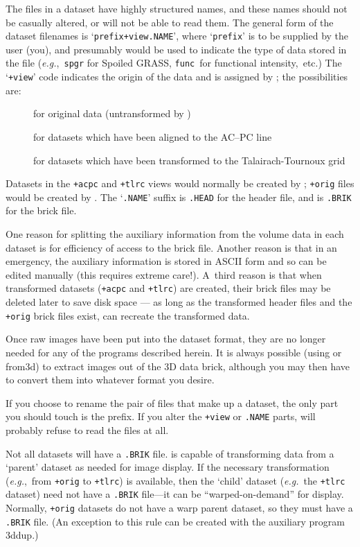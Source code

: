 The
files in a dataset have highly structured names, and these names should
not be casually altered, or \afnit will not be able to read them.
The general form of the dataset filenames is
`{\tt prefix+view.NAME}',
where `{\tt prefix}' is to be supplied by the user (you), and presumably
would be used to indicate the type of data stored in the file
({\it e.g.},~{\tt spgr} for Spoiled GRASS, {\tt func}~for functional intensity,~etc.)
The `{\tt +view}' code
indicates the origin of the data and is assigned by \afni;
the possibilities are:
\begin{description}
   \item[] for original data (untransformed by \afnit)
   \item[] for datasets which have been aligned to the AC--PC line
   \item[] for datasets which have been transformed to the Talairach-Tournoux grid
\end{description}
Datasets in the {\tt +acpc} and {\tt +tlrc} views would normally be
created by \afni; {\tt +orig} files would be created by \tothreed.
The `{\tt .NAME}' suffix is
{\tt .HEAD} for the header file, and is {\tt .BRIK} for the brick file.

One reason for splitting the auxiliary information from the volume data
in each dataset is for efficiency of access to the brick file.  Another
reason is that in an emergency, the auxiliary information is stored in
ASCII form and so can be edited manually (this requires extreme care!).
A~third reason is that when transformed datasets ({\tt +acpc} and {\tt +tlrc})
are created, their
brick files may be deleted later to save disk space --- as long as the
transformed header files and the {\tt +orig} brick files exist, \afnit
can recreate the transformed data.

Once raw images have been put into the \afnit dataset format, they are
no longer needed for any of the programs described herein.
It is always possible (using \afnit or {\sf from3d}) to extract images out of the 3D
data brick, although you may then have to convert them into whatever
format you desire.

If you choose to rename the pair of files that make up a dataset, the
only part you should touch is the prefix.  If you alter the {\tt +view}
or {\tt .NAME} parts, \afnit will probably refuse to read the files at all.

Not
all datasets will have a {\tt .BRIK} file.  \afnit is capable of
transforming data from a `parent' dataset as needed for image display.
If the necessary transformation ({\it e.g.},~from {\tt +orig} to {\tt +tlrc})
is available, then the `child' dataset ({\it e.g.}~the {\tt +tlrc} dataset)
need not have a {\tt .BRIK} file---it can be ``warped-on-demand'' for display.
Normally, {\tt +orig} datasets do not have a warp parent dataset, so they
must have a {\tt .BRIK} file.  (An exception to this rule can be
created with the auxiliary program {\sf 3ddup}.)

